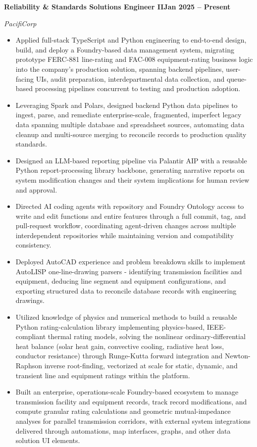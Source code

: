 \documentclass[10pt, letterpaper]{article}
\newcommand{\jobline}[2]{%
  \vspace{5pt}%
  \noindent\textbf{#1}\hfill\textbf{#2}\par%
  \vspace{1pt}%
}
\newcommand{\subline}[1]{%
  \vspace{-1pt}%
  \noindent\textit{#1}\par%
  \vspace{1pt}%
}
\newenvironment{rlist}{%
  \begin{itemize}[leftmargin=1.4em, itemsep=1pt, topsep=2pt, parsep=0pt]%
}{%
  \end{itemize}%
}
\begin{document}
\jobline{Reliability \& Standards Solutions Engineer II}{Jan 2025 -- Present}
\subline{PacifiCorp}
\begin{rlist}
  \item Applied full-stack TypeScript and Python engineering to end-to-end design, build, and deploy a Foundry-based data management system, migrating prototype FERC-881 line-rating and FAC-008 equipment-rating business logic into the company's production solution, spanning backend pipelines, user-facing UIs, audit preparation, interdepartmental data collection, and queue-based processing pipelines concurrent to testing and production adoption.
  \item Leveraging Spark and Polars, designed backend Python data pipelines to ingest, parse, and remediate enterprise-scale, fragmented, imperfect legacy data spanning multiple database and spreadsheet sources, automating data cleanup and multi-source merging to reconcile records to production quality standards.
  \item Designed an LLM-based reporting pipeline via Palantir AIP with a reusable Python report-processing library backbone, generating narrative reports on system modification changes and their system implications for human review and approval.
  \item Directed AI coding agents with repository and Foundry Ontology access to write and edit functions and entire features through a full commit, tag, and pull-request workflow, coordinating agent-driven changes across multiple interdependent repositories while maintaining version and compatibility consistency.
  \item Deployed AutoCAD experience and problem breakdown skills to implement AutoLISP one-line-drawing parsers - identifying transmission facilities and equipment, deducing line segment and equipment configurations, and exporting structured data to reconcile database records with engineering drawings.
  \item Utilized knowledge of physics and numerical methods to build a reusable Python rating-calculation library implementing physics-based, IEEE-compliant thermal rating models, solving the nonlinear ordinary-differential heat balance (solar heat gain, convective cooling, radiative heat loss, conductor resistance) through Runge-Kutta forward integration and Newton-Raphson inverse root-finding, vectorized at scale for static, dynamic, and transient line and equipment ratings within the platform.
  \item Built an enterprise, operations-scale Foundry-based ecosystem to manage transmission facility and equipment records, track record modifications, and compute granular rating calculations and geometric mutual-impedance analyses for parallel transmission corridors, with external system integrations delivered through automations, map interfaces, graphs, and other data solution UI elements.

\end{rlist}
\end{document}
